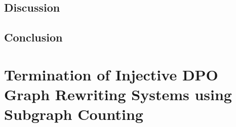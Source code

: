 \documentclass{book}
\begin{document}
\section{Discussion}
\label{sec:type_graph:related_work}


\section{Conclusion}
\label{sec:type_graph:conclusion}

 
 
% 


% 
% 
% 
% 
% 
% 
% 
% 
% 
% 







\chapter{Termination of Injective DPO Graph Rewriting
Systems using Subgraph Counting}
\end{document}
